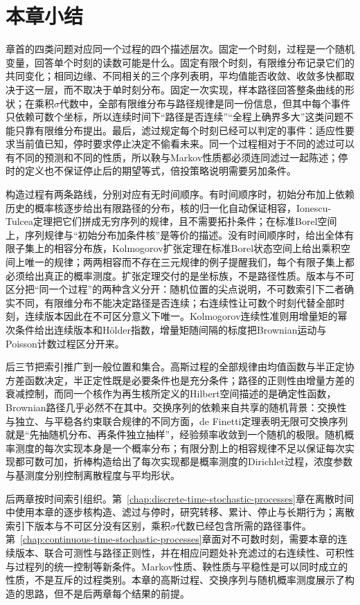 
\section{本章小结}
\label{sec:spp-summary}

章首的四类问题对应同一个过程的四个描述层次。固定一个时刻，过程是一个随机变量，回答单个时刻的读数可能是什么。固定有限个时刻，有限维分布记录它们的共同变化；相同边缘、不同相关的三个序列表明，平均值能否收敛、收敛多快都取决于这一层，而不取决于单时刻分布。固定一次实现，样本路径回答整条曲线的形状；在乘积$\sigma$代数中，全部有限维分布与路径规律是同一份信息，但其中每个事件只依赖可数个坐标，所以连续时间下“路径是否连续”“全程上确界多大”这类问题不能只靠有限维分布提出。最后，滤过规定每个时刻已经可以判定的事件：适应性要求当前值已知，停时要求停止决定不偷看未来。同一个过程相对于不同的滤过可以有不同的预测和不同的性质，所以鞅与Markov性质都必须连同滤过一起陈述；停时的定义也不保证停止后的期望等式，倍投策略说明需要另加条件。

构造过程有两条路线，分别对应有无时间顺序。有时间顺序时，初始分布加上依赖历史的概率核逐步给出有限路径的分布，核的归一化自动保证相容，Ionescu-Tulcea定理把它们拼成无穷序列的规律，且不需要拓扑条件；在标准Borel空间上，序列规律与“初始分布加条件核”是等价的描述。没有时间顺序时，给出全体有限子集上的相容分布族，Kolmogorov扩张定理在标准Borel状态空间上给出乘积空间上唯一的规律；两两相容而不存在三元规律的例子提醒我们，每个有限子集上都必须给出真正的概率测度。扩张定理交付的是坐标族，不是路径性质。版本与不可区分把“同一个过程”的两种含义分开：随机位置的尖点说明，不可数索引下二者确实不同，有限维分布不能决定路径是否连续；右连续性让可数个时刻代替全部时刻，连续版本因此在不可区分意义下唯一。Kolmogorov连续性准则用增量矩的幂次条件给出连续版本和Hölder指数，增量矩随间隔的标度把Brownian运动与Poisson计数过程区分开来。

后三节把索引推广到一般位置和集合。高斯过程的全部规律由均值函数与半正定协方差函数决定，半正定性既是必要条件也是充分条件；路径的正则性由增量方差的衰减控制，而同一个核作为再生核所定义的Hilbert空间描述的是确定性函数，Brownian路径几乎必然不在其中。交换序列的依赖来自共享的随机背景：交换性与独立、与平稳各约束联合规律的不同方面，de Finetti定理表明无限可交换序列就是“先抽随机分布、再条件独立抽样”，经验频率收敛到一个随机的极限。随机概率测度的每次实现本身是一个概率分布；有限分割上的相容规律不足以保证每次实现都可数可加，折棒构造给出了每次实现都是概率测度的Dirichlet过程，浓度参数与基测度分别控制离散程度与平均形状。

后两章按时间索引组织。第~\ref{chap:discrete-time-stochastic-processes}章在离散时间中使用本章的逐步核构造、滤过与停时，研究转移、累计、停止与长期行为；离散索引下版本与不可区分没有区别，乘积$\sigma$代数已经包含所需的路径事件。第~\ref{chap:continuous-time-stochastic-processes}章面对不可数时刻，需要本章的连续版本、联合可测性与路径正则性，并在相应问题处补充滤过的右连续性、可积性与过程列的统一控制等新条件。Markov性质、鞅性质与平稳性是可以同时成立的性质，不是互斥的过程类别。本章的高斯过程、交换序列与随机概率测度展示了构造的思路，但不是后两章每个结果的前提。
